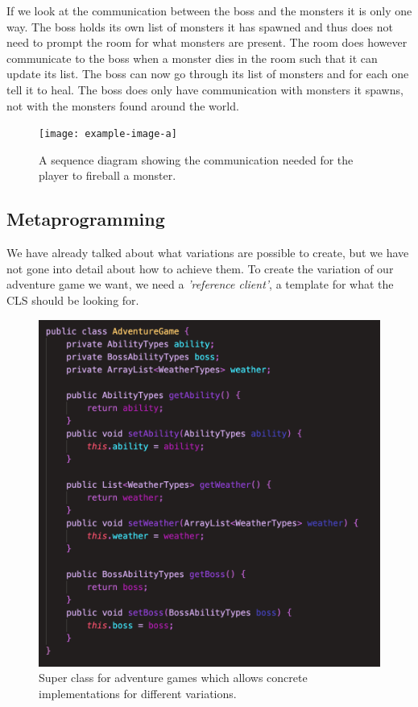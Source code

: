 If we look at the communication between the boss and the monsters it is only one way. The boss holds its own list of monsters it has spawned and thus does not need to prompt the room for what monsters are present. The room does however communicate to the boss when a monster dies in the room such that it can update its list. The boss can now go through its list of monsters and for each one tell it to heal. The boss does only have communication with monsters it spawns, not with the monsters found around the world.\\

\begin{figure}[H]
	\centering
	\texttt{[image: example-image-a]}
	\caption{A sequence diagram showing the communication needed for the player to fireball a monster.}
	\label{PLayerFireballFlow}
\end{figure}

\subsection{Metaprogramming} \label{Metalanguage}
We have already talked about what variations are possible to create, but we have not gone into detail about how to achieve them. To create the variation of our adventure game we want, we need a \textit{'reference client'}, a template for what the CLS should be looking for.
\begin{figure}
	\vspace{-10px}
	\centering
	\includegraphics[width=\linewidth]{Materials/Adventuregame/AdventureGame}
	\caption{Super class for adventure games which allows concrete implementations for different variations.}
	\label{MetalanguageAdventure}
\end{figure} 


